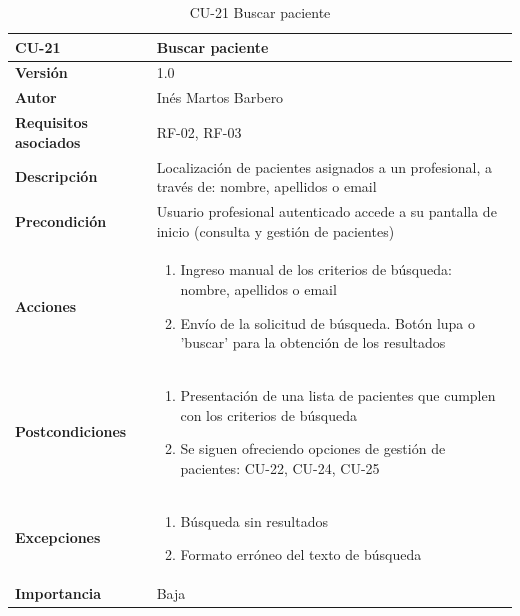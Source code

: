 \begin{table}[p]
	\centering
	\begin{tabularx}{\linewidth}{ p{} p{} }
		\toprule
		\textbf{CU-21}    & \textbf{Buscar paciente}\\
		\toprule
		\textbf{Versión}              & 1.0    \\
		\textbf{Autor}                & Inés Martos Barbero \\
		\textbf{Requisitos asociados} & RF-02, RF-03 \\
		\textbf{Descripción}          & Localización de pacientes asignados a un profesional, a través de: nombre, apellidos o email \\
		\textbf{Precondición}         & Usuario profesional autenticado accede a su pantalla de inicio (consulta y gestión de pacientes) \\
		\textbf{Acciones}             &
		\begin{enumerate}
			\def\labelenumi{\arabic{enumi}.}
			\tightlist
			\item Ingreso manual de los criterios de búsqueda: nombre, apellidos o email
			\item Envío de la solicitud de búsqueda. Botón lupa o 'buscar' para la obtención de los resultados
		\end{enumerate}\\
		\textbf{Postcondiciones}        & 
        \begin{enumerate}
			\def\labelenumi{\arabic{enumi}.}
			\tightlist
			\item Presentación de una lista de pacientes que cumplen con los criterios de búsqueda
			\item Se siguen ofreciendo opciones de gestión de pacientes: CU-22, CU-24, CU-25
		\end{enumerate}\\
		\textbf{Excepciones}          & 
        \begin{enumerate}
			\def\labelenumi{\arabic{enumi}.}
			\tightlist
			\item Búsqueda sin resultados
			\item Formato erróneo del texto de búsqueda
		\end{enumerate}\\
		\textbf{Importancia}          & Baja \\
		\bottomrule
	\end{tabularx}
	\caption{CU-21 Buscar paciente}
    \label{CU-21}
\end{table}

